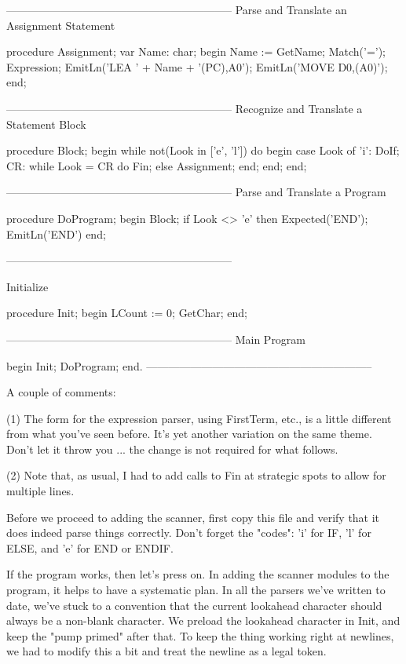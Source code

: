 \documentclass[float=false, crop=false]{standalone}
\begin{document}
\begin{code}
{--------------------------------------------------------------}
{ Parse and Translate an Assignment Statement }

procedure Assignment;
var Name: char;
begin
   Name := GetName;
   Match('=');
   Expression;
   EmitLn('LEA ' + Name + '(PC),A0');
   EmitLn('MOVE D0,(A0)');
end;


{--------------------------------------------------------------}
{ Recognize and Translate a Statement Block }

procedure Block;
begin
   while not(Look in ['e', 'l']) do begin
      case Look of
       'i': DoIf;
       CR: while Look = CR do
              Fin;
       else Assignment;
      end;
   end;
end;


{--------------------------------------------------------------}
{ Parse and Translate a Program }

procedure DoProgram;
begin
   Block;
   if Look <> 'e' then Expected('END');
   EmitLn('END')
end;


{--------------------------------------------------------------}

{ Initialize }

procedure Init;
begin
   LCount := 0;
   GetChar;
end;


{--------------------------------------------------------------}
{ Main Program }

begin
   Init;
   DoProgram;
end.
{--------------------------------------------------------------}
\end{code}

A couple of comments:

 (1) The form for the expression parser,  using  FirstTerm, etc.,
     is  a  little  different from what you've seen before.  It's
     yet another variation on the same theme.  Don't let it throw
     you ... the change is not required for what follows.

 (2) Note that, as usual, I had to add calls to Fin  at strategic
     spots to allow for multiple lines.

Before we proceed to adding the scanner, first copy this file and verify that it
does indeed parse things correctly. Don't forget the "codes": 'i' for IF, 'l'
for ELSE, and 'e' for END or ENDIF.

If the program works, then let's press on. In adding the scanner modules to the
program, it helps to have a systematic plan. In all the parsers we've written to
date, we've stuck to a convention that the current lookahead character should
always be a non-blank character. We preload the lookahead character in Init, and
keep the "pump primed" after that. To keep the thing working right at newlines,
we had to modify this a bit and treat the newline as a legal token.
\end{document}
